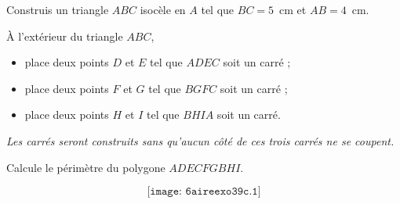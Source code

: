 \begin{myenumerate}
\item Construis un triangle $ABC$ isocèle en $A$ tel que $BC=5$~cm et
$AB=4$~cm.
\item \`A l'extérieur du triangle $ABC$,
  \begin{itemize}
  \item place deux points $D$ et $E$ tel que $ADEC$ soit un carré ;
  \item place deux points $F$ et $G$ tel que $BGFC$ soit un carré ;
  \item place deux points $H$ et $I$ tel que $BHIA$ soit un carré.
  \end{itemize}
{\em Les carrés seront construits sans qu'aucun côté de ces trois
carrés ne se coupent.}
  \item Calcule le périmètre du polygone $ADECFGBHI$.
\end{myenumerate}
\[\texttt{[image: 6aireexo39c.1]}\]